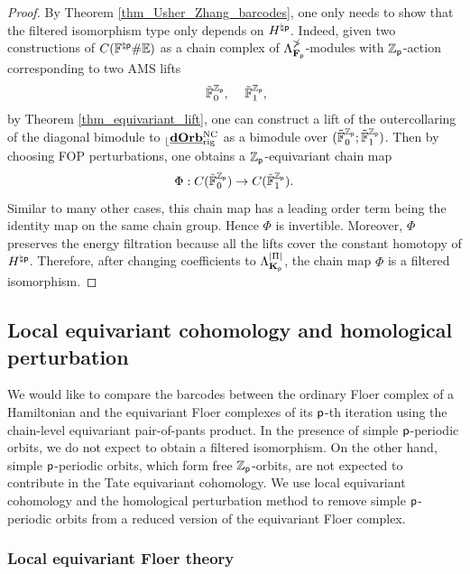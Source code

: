 \documentclass[reqno, 10pt]{amsart}
\numberwithin{equation}{section}
\numberwithin{equation}{section}
\theoremstyle{definition}
\theoremstyle{remark}
\newcommand{\beqn}{\begin{equation*}}
\newcommand{\eeqn}{\end{equation*}}
\newcommand{\mb}{\mathbb}
\newcommand{\p}{{\sf p}}
\newcommand{\fp}{{\bf F}_{\sf p}}
\newcommand{\kp}{{\bf K}_{\sf p}}
\newcommand{\zp}{{{\mb Z}_{\sf p}}}
\renewcommand{\outer}{{}_{\lfloor}}
\newcommand{\uds}[1]{\underline{\smash{#1}}}
\begin{document}
\begin{proof}
By Theorem \ref{thm_Usher_Zhang_barcodes}, one only needs to show that the filtered isomorphism type only depends on $H^{\natural \p}$. Indeed, given two constructions of $C({\mb F}^{\natural \p} \# {\mb E})$ as a chain complex of $\Lambda_{\fp}^{\mb\Pi}$-modules with $\zp$-action corresponding to two AMS lifts
\begin{align*}
&\ \tilde {\mb F}_0^{\zp}, &\ \tilde {\mb F}_1^{\zp},
\end{align*}
by Theorem \ref{thm_equivariant_lift}, one can construct a lift of the outercollaring of the diagonal bimodule to $\outer \uds{\bf dOrb}_{\rm rig}^{\rm NC}$ as a bimodule over $(\tilde {\mb F}_0^{\zp}; \tilde {\mb F}_1^{\zp})$. Then by choosing FOP perturbations, one obtains a $\zp$-equivariant chain map
\beqn
\Phi: C(\tilde{\mb F}_0^\zp) \to C(\tilde{\mb F}_1^\zp).
\eeqn
Similar to many other cases, this chain map has a leading order term being the identity map on the same chain group. Hence $\Phi$ is invertible. Moreover, $\Phi$ preserves the energy filtration because all the lifts cover the constant homotopy of $H^{\natural \p}$. Therefore, after changing coefficients to $\Lambda_{\kp}^{|\Pi|}$, the chain map $\Phi$ is a filtered isomorphism.
\end{proof}


\subsection{Local equivariant cohomology and homological perturbation}

We would like to compare the barcodes between the ordinary Floer complex of a Hamiltonian and the equivariant Floer complexes of its $\p$-th iteration using the chain-level equivariant pair-of-pants product. In the presence of simple $\p$-periodic orbits, we do not expect to obtain a filtered isomorphism. On the other hand, simple $\p$-periodic orbits, which form free $\zp$-orbits, are not expected to contribute in the Tate equivariant cohomology. We use local equivariant cohomology and the homological perturbation method to remove simple $\p$-periodic orbits from a reduced version of the equivariant Floer complex.


\subsubsection{Local equivariant Floer theory}
\end{document}
